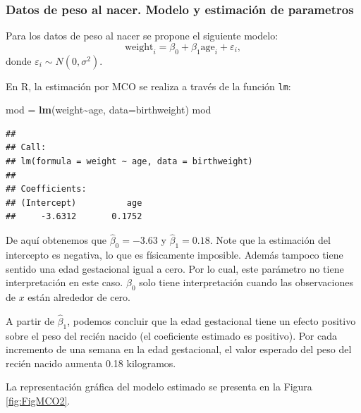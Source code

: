 \documentclass[
]{article}
\newenvironment{Shaded}{\begin{snugshade}}{\end{snugshade}}
\newcommand{\AttributeTok}[1]{\textcolor[rgb]{0.13,0.29,0.53}{#1}}
\newcommand{\FunctionTok}[1]{\textcolor[rgb]{0.13,0.29,0.53}{\textbf{#1}}}
\newcommand{\NormalTok}[1]{#1}
\newcommand{\OtherTok}[1]{\textcolor[rgb]{0.56,0.35,0.01}{#1}}
\newcommand{\SpecialCharTok}[1]{\textcolor[rgb]{0.81,0.36,0.00}{\textbf{#1}}}
\begin{document}
\hypertarget{datos-de-peso-al-nacer.-modelo-y-estimaciuxf3n-de-parametros}{%
\subsubsection*{Datos de peso al nacer. Modelo y estimación de parametros}\label{datos-de-peso-al-nacer.-modelo-y-estimaciuxf3n-de-parametros}}

Para los datos de peso al nacer se propone el siguiente modelo:
\begin{equation}
\mbox{weight}_{i}= \beta_{0} + \beta_{1}\mbox{age}_{i} + \varepsilon_{i},
\label{eq:modBirthweight}
\end{equation}
donde \(\varepsilon_{i} \sim N(0,\sigma^{2})\).

En R, la estimación por MCO se realiza a través de la función \texttt{lm}:

\begin{Shaded}
\begin{Highlighting}[]
\NormalTok{mod }\OtherTok{=} \FunctionTok{lm}\NormalTok{(weight}\SpecialCharTok{\textasciitilde{}}\NormalTok{age, }\AttributeTok{data=}\NormalTok{birthweight)}
\NormalTok{mod}
\end{Highlighting}
\end{Shaded}

\begin{verbatim}
## 
## Call:
## lm(formula = weight ~ age, data = birthweight)
## 
## Coefficients:
## (Intercept)          age  
##     -3.6312       0.1752
\end{verbatim}

De aquí obtenemos que \(\widehat{\beta}_{0} =-3.63\) y \(\widehat{\beta}_{1} =0.18\). Note que la estimación del intercepto es negativa, lo que es físicamente imposible. Además tampoco tiene sentido una edad gestacional igual a cero. Por lo cual, este parámetro no tiene interpretación en este caso. \(\beta_{0}\) solo tiene interpretación cuando las observaciones de \(x\) están alrededor de cero.

A partir de \(\widehat{\beta}_{1}\), podemos concluir que la edad gestacional tiene un efecto positivo sobre el peso del recién nacido (el coeficiente estimado es positivo). Por cada incremento de una semana en la edad gestacional, el valor esperado del peso del recién nacido aumenta 0.18 kilogramos.

La representación gráfica del modelo estimado se presenta en la Figura \ref{fig:FigMCO2}.
\end{document}

